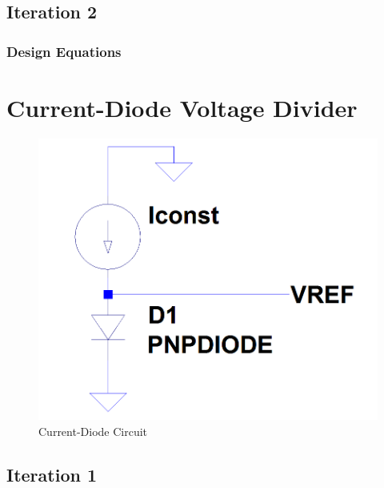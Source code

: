 \documentclass[conference]{IEEEtran}
\begin{document}
\subsection{Iteration 2}
\subsubsection{Design Equations}
\section{Current-Diode Voltage Divider}
\begin{figure}[!htbp]
  \centering
  \includegraphics[scale=0.25]{images/cm-diode1.png}
  \caption[cm-diode1]{Current-Diode Circuit}
  \label{fig:cm-diode1}
\end{figure}
\subsection{Iteration 1}
\end{document}
